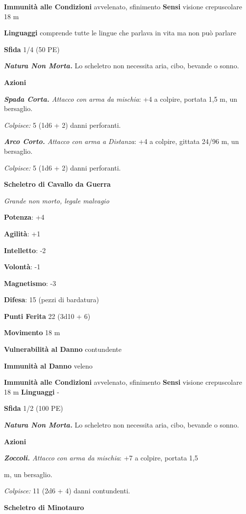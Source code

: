 \begin{multicols}{2}
\textbf{Immunità alle Condizioni} avvelenato, sfinimento \textbf{Sensi}
visione crepuscolare 18 m

\textbf{Linguaggi} comprende tutte le lingue che parlava in vita ma non
può parlare

\textbf{Sfida} 1/4 (50 PE)

\emph{\textbf{Natura Non Morta.}} Lo scheletro non necessita aria, cibo,
bevande o sonno.

\textbf{Azioni}

\emph{\textbf{Spada Corta.} Attacco con arma da mischia}: +4 a colpire,
portata 1,5 m, un bersaglio.

\emph{Colpisce:} 5 (1d6 + 2) danni perforanti.

\emph{\textbf{Arco Corto.} Attacco con arma a Distanza}: +4 a colpire,
gittata 24/96 m, un bersaglio.

\emph{Colpisce:} 5 (1d6 + 2) danni perforanti.

\textbf{Scheletro di Cavallo da Guerra}

\emph{Grande non morto, legale malvagio}

\textbf{Potenza}: +4

\textbf{Agilità}: +1

\textbf{Intelletto}: -2

\textbf{Volontà}: -1

\textbf{Magnetismo}: -3

\textbf{Difesa}: 15 (pezzi di bardatura)

\textbf{Punti Ferita} 22 (3d10 + 6)

\textbf{Movimento} 18 m

\textbf{Vulnerabilità al Danno} contundente

\textbf{Immunità al Danno} veleno

\textbf{Immunità alle Condizioni} avvelenato, sfinimento \textbf{Sensi}
visione crepuscolare 18 m \textbf{Linguaggi} -

\textbf{Sfida} 1/2 (100 PE)

\emph{\textbf{Natura Non Morta.}} Lo scheletro non necessita aria, cibo,
bevande o sonno.

\textbf{Azioni}


\emph{\textbf{Zoccoli.} Attacco con arma da mischia}: +7 a colpire,
portata 1,5

m, un bersaglio.

\emph{Colpisce:} 11 (2d6 + 4) danni contundenti.


\textbf{Scheletro di Minotauro}


\end{multicols}
